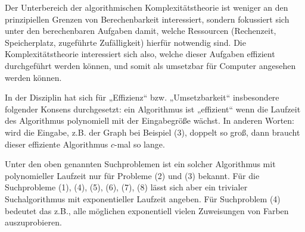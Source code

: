 Der Unterbereich der algorithmischen Komplexitätstheorie ist weniger an den prinzipiellen Grenzen von Berechenbarkeit interessiert, sondern fokussiert sich unter den berechenbaren Aufgaben damit, welche Ressourcen (Rechenzeit, Speicherplatz, zugeführte Zufälligkeit) hierfür notwendig sind. Die Komplexitätstheorie interessiert sich also, welche dieser Aufgaben effizient durchgeführt werden können, und somit als umsetzbar für Computer angesehen werden können. 

In der Disziplin hat sich für „Effizienz“ bzw. „Umsetzbarkeit“ insbesondere folgender Konsens durchgesetzt: ein Algorithmus ist „effizient“ wenn die Laufzeit des Algorithmus polynomiell mit der Eingabegröße wächst. In anderen Worten: wird die Eingabe, z.B. der Graph bei Beispiel (3), doppelt so groß, dann braucht dieser effiziente Algorithmus $c$-mal so lange.

\pagebreak
Unter den oben genannten Suchproblemen ist ein solcher Algorithmus mit polynomieller Laufzeit nur für Probleme (2) und (3) bekannt.
Für die Suchprobleme (1), (4), (5), (6), (7), (8) lässt sich aber ein trivialer Suchalgorithmus mit exponentieller Laufzeit angeben. Für Suchproblem (4) bedeutet das z.B., alle möglichen exponentiell vielen Zuweisungen von Farben auszuprobieren.


